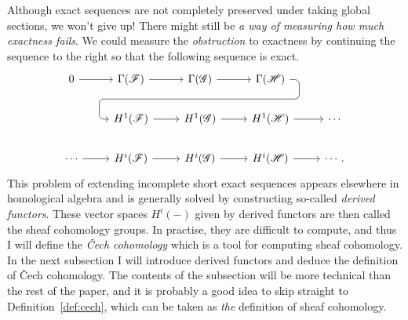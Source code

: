 Although exact sequences are not completely preserved under taking
global sections, we won't give up! There might still be \emph{a way of
measuring how much exactness fails}. We could measure the
\emph{obstruction} to exactness by continuing the sequence to the right
so that the following sequence is exact.
\[
\begin{tikzcd}
  0 \rar & \Gamma(\mathscr{F}) \rar & \Gamma(\mathscr{G})
  \rar\dar[phantom, ""{coordinate, name=Z}] & \Gamma(\mathscr{H})
  \arrow[rounded corners, to path={ -- ([xshift=2ex]\tikztostart.east)
    |- (Z) -| ([xshift=-2ex]\tikztotarget.west) -- (\tikztotarget)},
  overlay]{dll} & \\
    & H^{1}(\mathscr{F}) \rar & H^{1}(\mathscr{G})
  \rar & H^{1}(\mathscr{H}) \rar & \cdots \\
  \cdots \rar& H^{i}(\mathscr{F}) \rar & H^{i}(\mathscr{G})
  \rar & H^{i}(\mathscr{H}) \rar & \cdots.
\end{tikzcd}
\]
This problem of extending incomplete short exact sequences appears
elsewhere in homological algebra and is generally solved by constructing
so-called \emph{derived functors}. These vector spaces $H^{i}(-)$ given by
derived functors are then called the sheaf cohomology groups. In practise,
they are difficult to compute, and thus I will define the \emph{\v Cech
  cohomology} which is a tool for computing sheaf cohomology.
In the next subsection I will introduce derived functors and deduce the
definition of \v Cech cohomology. The contents of the subsection will be
more technical than the rest of the paper, and it is probably a good idea
to skip straight to Definition~\ref{def:cech}, which can be taken as
\emph{the} definition of sheaf cohomology.

